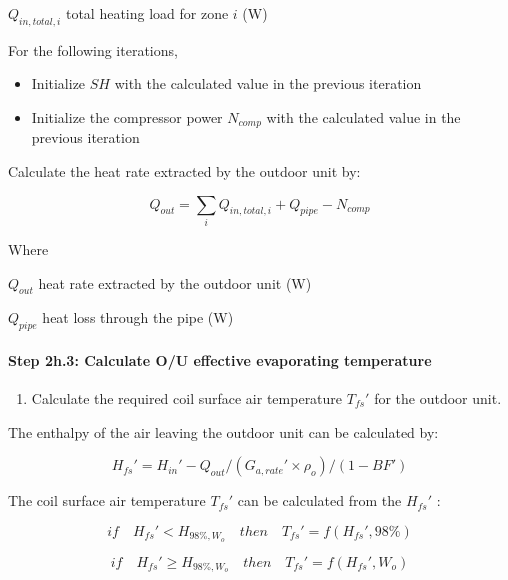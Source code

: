 \(Q_{in,total,i}\) total heating load for zone \(i\) (W)

For the following iterations,

\begin{itemize}
\item
  Initialize \(SH\) with the calculated value in the previous iteration
\item
  Initialize the compressor power \(N_{comp}\) with the calculated value in the previous iteration
\end{itemize}

Calculate the heat rate extracted by the outdoor unit by:

\begin{equation}
Q_{out} = \sum_iQ_{in,total,i}+Q_{pipe}-N_{comp}
\end{equation}

Where

\(Q_{out}\) heat rate extracted by the outdoor unit (W)

\(Q_{pipe}\) heat loss through the pipe (W)

\paragraph{Step 2h.3: Calculate O/U effective evaporating temperature}\label{step-2h.3-calculate-ou-effective-evaporating-temperature}

\begin{enumerate}
\def\labelenumi{(\arabic{enumi})}
\tightlist
\item
  Calculate the required coil surface air temperature \({T_{fs}}'\) for the outdoor unit.
\end{enumerate}

The enthalpy of the air leaving the outdoor unit can be calculated by:

\begin{equation}
{H_{fs}}' = {H_{in}}'-Q_{out}/({G_{a,rate}}'\times{\rho_o})/(1-BF')
\end{equation}

The coil surface air temperature \({T_{fs}}'\) can be calculated from the \({H_{fs}}'\) :

\begin{equation}
if\quad{H_{fs}}'<H_{98\%,W_o}\quad{then}\quad{T_{fs}}' = f({H_{fs}}',98\%)
\end{equation}

\begin{equation}
if\quad{H_{fs}}'\ge{H_{98\%,W_o}}\quad{then}\quad{T_{fs}}' = f({H_{fs}}',W_o)
\end{equation}

